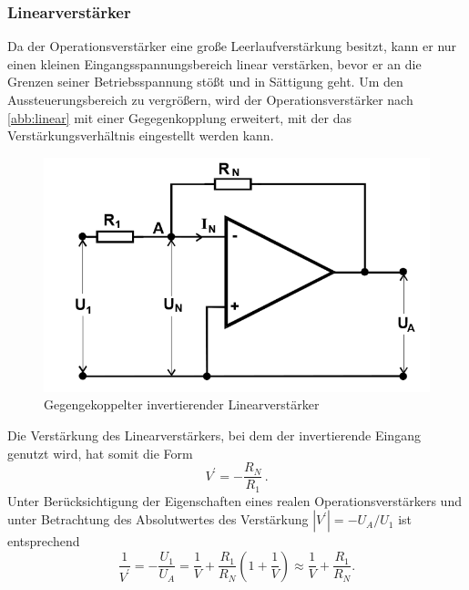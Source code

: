 \subsubsection{Linearverst{\"a}rker}
Da der Operationsverstärker eine große Leerlaufverstärkung besitzt, kann  er nur einen kleinen Eingangsspannungsbereich linear verstärken, bevor er an die Grenzen  seiner Betriebsspannung stößt und in Sättigung geht. Um den Aussteuerungsbereich zu vergrößern, wird der Operationsverstärker nach \autoref{abb:linear} mit einer Gegegenkopplung erweitert, mit der das Verstärkungsverhältnis eingestellt werden kann.
\begin{figure}[h!]
	\centering
	\includegraphics[width=\textwidth]{img/linear.png}
	\caption{Gegengekoppelter invertierender Linearverstärker \cite{FP}}
	\label{abb:linear}
\end{figure}
Die Verstärkung des Linearverstärkers, bei dem der invertierende Eingang genutzt wird, hat somit die Form
\begin{equation}
V^\prime = - \frac{R_N}{R_1}\,.
\end{equation}
Unter Berücksichtigung der Eigenschaften eines realen Operationsverstärkers und unter Betrachtung des Absolutwertes des Verstärkung $|V^\prime| = -U_A/U_1$ ist entsprechend
\begin{equation}
\frac{1}{V^\prime} = - \frac{U_1}{U_A} = \frac{1}{V} + \frac{R_1}{R_N} \left( 1 + \frac{1}{V} \right) \approx \frac{1}{V} + \frac{R_1}{R_N}.
\label{effVerstaerkung}
\end{equation}



